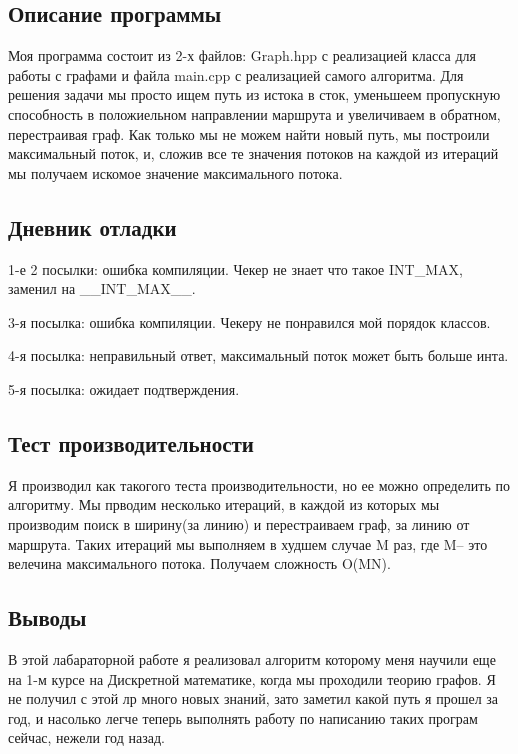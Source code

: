 \documentclass[12pt]{article}
\begin{document}
\subsection*{Описание программы}

Моя программа состоит из 2-х файлов: Graph.hpp с реализацией класса для работы с графами и файла main.cpp с реализацией самого алгоритма. Для решения задачи мы просто ищем путь из истока в сток, уменьшеем пропускную способность в положиельном направлении маршрута и увеличиваем в обратном, перестраивая граф. Как только мы не можем найти новый путь, мы построили максимальный поток, и, сложив все те значения потоков на каждой из итераций мы получаем искомое значение максимального потока.

\subsection*{Дневник отладки}

1-е 2 посылки: ошибка компиляции. Чекер не знает что такое INT\_MAX, заменил на \_\_INT\_MAX\_\_.

3-я посылка: ошибка компиляции. Чекеру не понравился мой порядок классов.

4-я посылка: неправильный ответ, максимальный поток может быть больше инта.

5-я посылка: ожидает подтверждения.
\subsection*{Тест производительности}

Я производил как такогого теста производительности, но ее можно определить по алгоритму. Мы прводим несколько итераций, в каждой из которых мы производим поиск в ширину(за линию) и перестраиваем граф, за линию от маршрута. Таких итераций мы выполняем в худшем случае M раз, где M-- это велечина максимального потока. Получаем сложность O(MN). 

\subsection*{Выводы}

В этой лабараторной работе я реализовал алгоритм которому меня научили еще на 1-м курсе на Дискретной математике, когда мы проходили теорию графов. Я не получил с этой лр много новых знаний, зато заметил какой путь я прошел за год, и насолько легче теперь выполнять работу по написанию таких програм сейчас, нежели год назад.
\end{document}
